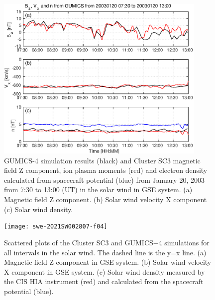 \documentclass[draft]{agujournal2019}
\begin{document}
\pagebreak

\begin{figure}[h]
\centering
\includegraphics[width=0.9\textwidth,angle=0]{swe-2021SW002807-f03} 
\caption{GUMICS-4 simulation results (black) and Cluster SC3 magnetic field Z component, ion plasma moments (red) and electron density calculated from spacecraft potential (blue) from January 20, 2003 from 7:30 to 13:00 (UT) in the solar wind in GSE system. (a) Magnetic field Z component. (b) Solar wind velocity X component (c) Solar wind density.}
\label{fig:swplot}
\end{figure}

\pagebreak

\begin{figure}[h]
\centering
\texttt{[image: swe-2021SW002807-f04]}
\caption{Scattered plots of the Cluster SC3 and GUMICS$-$4 simulations for all intervals in the solar wind. The dashed line is the y=x line. (a) Magnetic field Z component in GSE system. (b) Solar wind velocity X component in GSE system. (c) Solar wind density measured by the CIS HIA instrument (red) and calculated from the spacecraft potential (blue).}
\label{fig:swscatplot}
\end{figure}

\pagebreak
\end{document}
